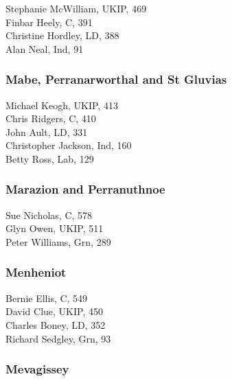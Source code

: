 \documentclass[a4paper,openany,10pt]{book}
\begin{document}
Stephanie McWilliam, UKIP, 469\\
Finbar Heely, C, 391\\
Christine Hordley, LD, 388\\
Alan Neal, Ind, 91\\


\subsubsection*{Mabe, Perranarworthal and St Gluvias}



Michael Keogh, UKIP, 413\\
Chris Ridgers, C, 410\\
John Ault, LD, 331\\
Christopher Jackson, Ind, 160\\
Betty Ross, Lab, 129\\


\subsubsection*{Marazion and Perranuthnoe}



Sue Nicholas, C, 578\\
Glyn Owen, UKIP, 511\\
Peter Williams, Grn, 289\\


\subsubsection*{Menheniot}



Bernie Ellis, C, 549\\
David Clue, UKIP, 450\\
Charles Boney, LD, 352\\
Richard Sedgley, Grn, 93\\


\subsubsection*{Mevagissey}

\end{document}
